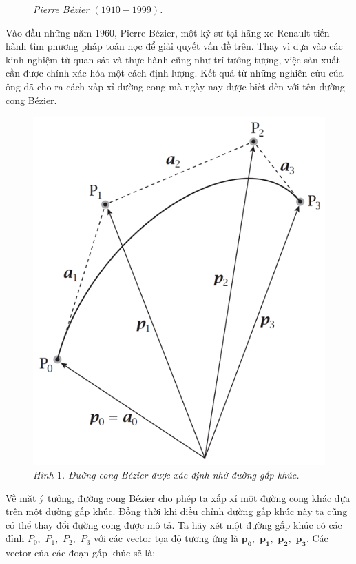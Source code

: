\begin{multicols}{2}
\begin{figure}[H]
		\caption{\small\textit{\color{toanhocdoisong}Pierre Bézier $(1910 - 1999)$.}}
		\vspace*{-10pt}
	\end{figure}	
	Vào đầu những năm $1960$, Pierre Bézier, một kỹ sư tại hãng xe Renault tiến hành tìm phương pháp toán học để giải quyết vấn đề trên. Thay vì dựa vào các kinh nghiệm từ quan sát và thực hành cũng như trí tưởng tượng, việc sản xuất cần được chính xác hóa một cách định lượng. Kết quả từ những nghiên cứu của ông đã cho ra cách xấp xỉ đường cong mà ngày nay được biết đến với tên đường cong Bézier.
	\begin{figure}[H]
		\vspace*{-5pt}
		\centering
		\captionsetup{labelformat= empty, justification=centering}
		\includegraphics[width= 0.85\linewidth]{2}
		\caption{\small\textit{\color{toanhocdoisong}Hình $1$. Đường cong Bézier được xác định nhờ đường gấp khúc.}}
		\vspace*{-10pt}
	\end{figure}
	Về mặt ý tưởng, đường cong Bézier cho phép ta xấp xỉ một đường cong khác dựa trên một đường gấp khúc. Đồng thời khi điều chỉnh đường gấp khúc này ta cũng có thể thay đổi đường cong được mô tả.
	\vskip 0.1cm
	Ta hãy xét một đường gấp khúc có các đỉnh $P_0,$ $P_1,$ $P_2,$ $P_3$ với các vector tọa độ tương ứng là $\pmb{p_0},$ $\pmb{p_1},$ $\pmb{p_2},$ $\pmb{p_3}$. Các vector của các đoạn gấp khúc sẽ là:

\end{multicols}

